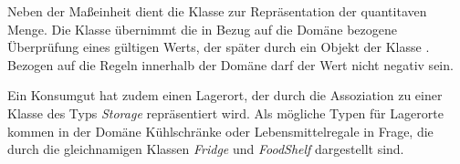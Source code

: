 Neben der Maßeinheit dient die Klasse \href{https://github.com/lucasmerkel/dhbw-advancedswe-programmentwurf/blob/5764d7da4cfd0562ed8e96128e92f85c30b7309d/swe_programmentwurf/consumergoods-inventory-planner/4-cip-abstractioncode/src/main/java/de/dhbw/cip/abstractioncode/Value.java}{} zur Repräsentation der quantitaven Menge.
Die Klasse \href{https://github.com/lucasmerkel/dhbw-advancedswe-programmentwurf/blob/5764d7da4cfd0562ed8e96128e92f85c30b7309d/swe_programmentwurf/consumergoods-inventory-planner/3-cip-domain/src/main/java/de/dhbw/cip/domain/ValueValidator.java}{} übernimmt die in Bezug auf die Domäne bezogene Überprüfung eines gültigen Werts, der später durch ein Objekt der Klasse \href{https://github.com/lucasmerkel/dhbw-advancedswe-programmentwurf/blob/5764d7da4cfd0562ed8e96128e92f85c30b7309d/swe_programmentwurf/consumergoods-inventory-planner/4-cip-abstractioncode/src/main/java/de/dhbw/cip/abstractioncode/Value.java}{}.
Bezogen auf die Regeln innerhalb der Domäne darf der Wert nicht negativ sein.

Ein Konsumgut hat zudem einen Lagerort, der durch die Assoziation zu einer Klasse des Typs \textit{Storage} repräsentiert wird.
Als mögliche Typen für Lagerorte kommen in der Domäne Kühlschränke oder Lebensmittelregale in Frage, die durch die gleichnamigen Klassen \textit{Fridge} und \textit{FoodShelf} dargestellt sind.

